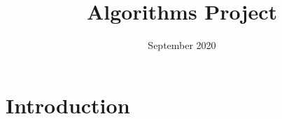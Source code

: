 \documentclass{beamer} %
\title{Algorithms Project}
\date{September 2020}
\begin{document}
\maketitle

\section{Introduction}
\end{document}
